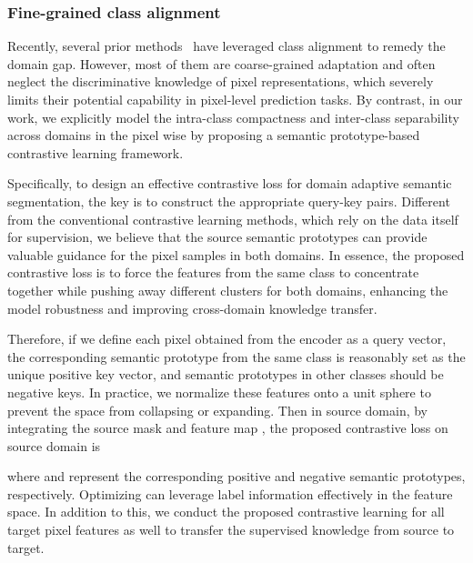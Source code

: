 \documentclass[runningheads]{llncs}
\begin{document}
\subsubsection{Fine-grained class alignment}
\label{sec:alignment}
Recently, several prior methods~\cite{du2019ssf-dan,luo2019taking,wang2020differential,zhang2019category,pixmatch2021_CVPR} have leveraged class alignment to remedy the domain gap. However, most of them are coarse-grained adaptation and often neglect the discriminative knowledge of pixel representations, which severely limits their potential capability in pixel-level prediction tasks. By contrast, in our work, we explicitly model the intra-class compactness and inter-class separability across domains in the pixel wise by proposing a semantic prototype-based contrastive learning framework. 


Specifically, to design an effective contrastive loss for domain adaptive semantic segmentation, the key is to construct the appropriate query-key pairs. Different from the conventional contrastive learning methods, which rely on the data itself for supervision, we believe that the source semantic prototypes can provide valuable guidance for the pixel samples in both domains. In essence, the proposed contrastive loss is to force the features from the same class to concentrate together while pushing away different clusters for both domains, enhancing the model robustness and improving cross-domain knowledge transfer. 

Therefore, if we define each pixel obtained from the encoder  as a query vector, the corresponding semantic prototype from the same class is reasonably set as the unique positive key vector, and semantic prototypes in other  classes should be negative keys. In practice, we normalize these features onto a unit sphere to prevent the space from collapsing or expanding. Then in source domain, by integrating the source mask  and feature map , the proposed contrastive loss on source domain is
 \begin{small}
    
\end{small}where  and  represent the corresponding positive and  negative semantic prototypes, respectively.
Optimizing  can leverage label information effectively in the feature space. In addition to this, we conduct the proposed contrastive learning for all target pixel features as well to transfer the supervised knowledge from source to target.
\end{document}
